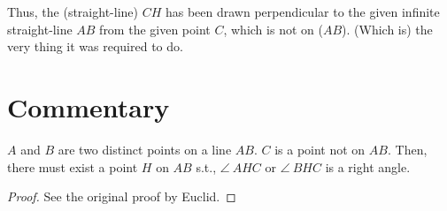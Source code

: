 Thus, the (straight-line) $CH$ has been drawn perpendicular to the given infinite straight-line $AB$ from the given point $C$, which is not
on  ($AB$). (Which is) the very thing it was required to do.


\section*{Commentary}

\begin{proposition}\label{proposition_12}\leanok
    $A$ and $B$ are two distinct points on a line $AB$. $C$ is a point not on $AB$. Then, there must exist a point $H$ on $AB$ s.t., $\angle~AHC$ or $\angle~BHC$ is a right angle.
\end{proposition}
\begin{proof}
    \leanok
    See the original proof by Euclid.
\end{proof}
